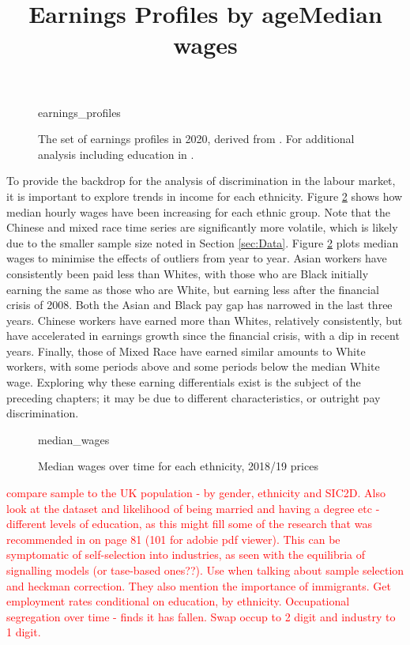 \documentclass[class=article, crop=false]{standalone}
\begin{document}
\begin{figure}[h]
\centering
    \title{Earnings Profiles by age}
    {earnings_profiles}
    \caption{The set of earnings profiles in 2020, derived from \citep{ONSc}. For additional analysis including education in \citep{Mincer}.}
    \label{fig:earnings_profiles}
\end{figure}

To provide the backdrop for the analysis of discrimination in the labour market, it is important to explore trends in income for each ethnicity. Figure \ref{fig:median_wages} shows how median hourly wages have been increasing for each ethnic group. Note that the Chinese and mixed race time series are significantly more volatile, which is likely due to the smaller sample size noted in Section \ref{sec:Data}. Figure \ref{fig:median_wages} plots median wages to minimise the effects of outliers from year to year. Asian workers have consistently been paid less than Whites, with those who are Black initially earning the same as those who are White, but earning less after the financial crisis of 2008. Both the Asian and Black pay gap has narrowed in the last three years. Chinese workers have earned more than Whites, relatively consistently, but have accelerated in earnings growth since the financial crisis, with a dip in recent years. Finally, those of Mixed Race have earned similar amounts to White workers, with some periods above and some periods below the median White wage. Exploring why these earning differentials exist is the subject of the preceding chapters; it may be due to different characteristics, or outright pay discrimination.

\begin{figure}[]
\centering
    \title{Median wages}
    {median_wages}
    \caption{Median wages over time for each ethnicity, 2018/19 prices}
    \label{fig:median_wages}
\end{figure}

\textcolor{red}{compare sample to the UK population - by gender, ethnicity and SIC2D. Also look at the dataset and likelihood of being married and having a degree etc - different levels of education, as this might fill some of the research that was recommended in \citep{Longhi2} on page 81 (101 for adobie pdf viewer).
This can be symptomatic of self-selection into industries, as seen with the equilibria of signalling models (or tase-based ones??).
Use \citep{Shields} when talking about sample selection and heckman correction. They also mention the importance of immigrants.
Get employment rates conditional on education, by ethnicity.
Occupational segregation over time - \citep{Longhi3} finds it has fallen.
Swap occup to 2 digit and industry to 1 digit.}
\end{document}
